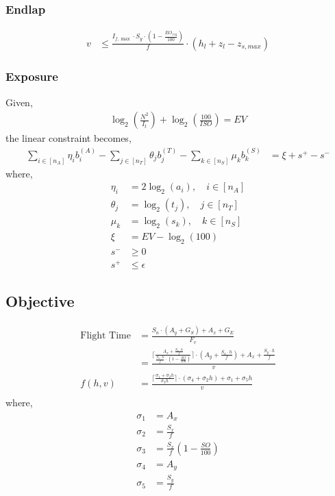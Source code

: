 \documentclass[11pt]{article}
\begin{document}
\subsubsection{Endlap}

\begin{align}
  v &\leq  \frac{I_{f,\max} \cdot S_y \cdot (1-\frac{EO_{req}}{100})}{f} \cdot (h_l + z_l - z_{s,max})
\end{align}

\subsubsection{Exposure}
Given,
\begin{align}
  \log_2(\frac{N^2}{I_t}) + \log_2(\frac{100}{ISO}) = EV 
\end{align}
\noindent
the linear constraint becomes,
\begin{align}
  \sum_{i \in [n_A]} \eta_ib_i^{(A)} - \sum_{j \in [n_T]} \theta_jb_j^{(T)} - \sum_{k \in [n_S]} \mu_kb_k^{(S)} &= \xi + s^+ - s^-
\end{align}
\noindent
where,
\begin{align}
  \eta_i &= 2\log_2(a_i), \quad i \in [n_A]\\
  \theta_j &= \log_2(t_j), \quad j \in [n_T]\\
  \mu_k &= \log_2(s_k), \quad  k \in [n_S]\\
  \xi &= EV - \log_2(100)\\
  s^- &\geq 0\\
  s^+ &\leq \epsilon
\end{align}
\newpage
\subsection{Objective}
\begin{align}
  \text{Flight Time} &= \frac{S_n \cdot (A_y + G_S) + A_x + G_E}{F_{v}}\\
  &= \frac{\lceil\frac{A_x + \frac{S_x \cdot h}{f}}{\frac{S_x \cdot h}{f} \cdot (1-\frac{SO}{100})}\rceil \cdot (A_y + \frac{S_x \cdot h }{f}) + A_x + \frac{S_y \cdot h}{f}}{v}\\
  f(h,v)&= \frac{\lceil\frac{\sigma_1 + \sigma_2h}{\sigma_3h}\rceil \cdot (\sigma_4 + \sigma_2h) + \sigma_1 + \sigma_5h}{v}\\
\end{align}
where,
\begin{align}
  \sigma_1 &= A_x\\
  \sigma_2 &= \frac{S_x}{f}\\
  \sigma_3 &= \frac{S_x}{f}(1-\frac{SO}{100})\\
  \sigma_4 &= A_y\\
  \sigma_5 &= \frac{S_y}{f}
\end{align}
\end{document}
